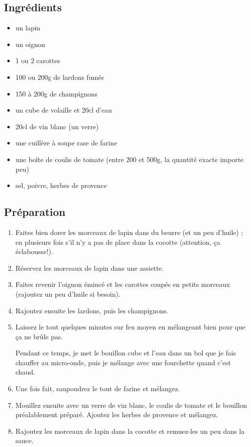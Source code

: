 \subsection*{Ingrédients}
\begin{itemize}
\item un lapin
\item un oignon
\item 1 ou 2 carottes
\item 100 ou 200g de lardons fumés
\item 150 à 200g de champignons
\item un cube de volaille et 20cl d'eau
\item 20cl de vin blanc (un verre)
\item une cuillère à soupe rase de farine
\item une boîte de coulis de tomate (entre 200 et 500g, la quantité exacte importe peu)
\item sel, poivre, herbes de provence
\end{itemize}

\subsection*{Préparation}
\begin{enumerate}
\item Faites bien dorer les morceaux de lapin dans du beurre (et un peu d'huile) ; en plusieurs fois s'il n'y a pas de place dans la cocotte (attention, ça éclabousse!).
\item Réservez les morceaux de lapin dans une assiette.
\item Faites revenir l'oignon émincé et les carottes coupés en petits morceaux (rajoutez un peu d'huile si besoin).
\item Rajoutez ensuite les lardons, puis les champignons.
\item Laissez le tout quelques minutes sur feu moyen en mélangeant bien pour que ça ne brûle pas.
\begin{remarque}
Pendant ce temps, je met le bouillon cube et l'eau dans un bol que je fais chauffer au micro-onde, puis je mélange avec une fourchette quand c'est chaud.
\end{remarque}
\item Une fois fait, saupoudrez le tout de farine et mélangez. 
\item Mouillez ensuite avec un verre de vin blanc, le coulis de tomate et le bouillon préalablement préparé. Ajoutez les herbes de provence et mélangez.
\item Rajoutez les morceaux de lapin dans la cocotte et remuez-les un peu dans la sauce.
\end{enumerate}

